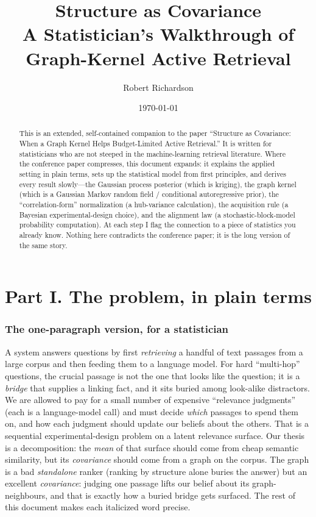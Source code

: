 \documentclass[11pt]{article}
\title{\textbf{Structure as Covariance}\\[2pt]\large A Statistician's Walkthrough of Graph-Kernel Active Retrieval}
\author{Robert Richardson}
\date{\today}
\theoremstyle{plain}
\theoremstyle{definition}
\theoremstyle{remark}
\begin{document}
\maketitle
\begin{abstract}
\noindent This is an extended, self-contained companion to the paper ``Structure as Covariance: When a Graph Kernel
Helps Budget-Limited Active Retrieval.'' It is written for statisticians who are not steeped in the machine-learning
retrieval literature. Where the conference paper compresses, this document expands: it explains the applied setting
in plain terms, sets up the statistical model from first principles, and derives every result slowly---the Gaussian
process posterior (which is kriging), the graph kernel (which is a Gaussian Markov random field / conditional
autoregressive prior), the ``correlation-form'' normalization (a hub-variance calculation), the acquisition rule (a
Bayesian experimental-design choice), and the alignment law (a stochastic-block-model probability computation). At
each step I flag the connection to a piece of statistics you already know. Nothing here contradicts the conference
paper; it is the long version of the same story.
\end{abstract}

\tableofcontents
\bigskip

\part*{Part I. The problem, in plain terms}

\section{The one-paragraph version, for a statistician}
A system answers questions by first \emph{retrieving} a handful of text passages from a large corpus and then
feeding them to a language model. For hard ``multi-hop'' questions, the crucial passage is not the one that looks
like the question; it is a \emph{bridge} that supplies a linking fact, and it sits buried among look-alike
distractors. We are allowed to pay for a small number of expensive ``relevance judgments'' (each is a language-model
call) and must decide \emph{which} passages to spend them on, and how each judgment should update our beliefs about
the others. That is a sequential experimental-design problem on a latent relevance surface. Our thesis is a
decomposition: the \emph{mean} of that surface should come from cheap semantic similarity, but its \emph{covariance}
should come from a graph on the corpus. The graph is a bad \emph{standalone} ranker (ranking by structure alone
buries the answer) but an excellent \emph{covariance}: judging one passage lifts our belief about its
graph-neighbours, and that is exactly how a buried bridge gets surfaced. The rest of this document makes each italicized word precise.
\end{document}
